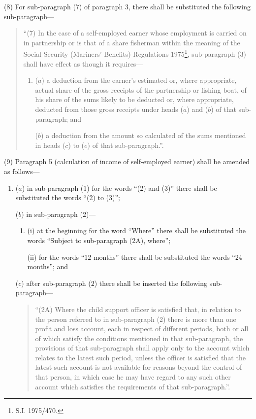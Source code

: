 \documentclass[12pt,a4paper]{article}
\begin{document}
(8) For sub-paragraph (7) of paragraph 3, there shall be substituted the following sub-paragraph—
\begin{quotation}
“(7) In the case of a self-employed earner whose employment is carried on in partnership or is that of a share fisherman within the meaning of the Social Security (Mariners' Benefits) Regulations 1975\footnote{\frenchspacing S.I. 1975/470.}, sub-paragraph (3) shall have effect as though it requires—
\begin{enumerate}\item[]
($a$) a deduction from the earner’s estimated or, where appropriate, actual share of the gross receipts of the partnership or fishing boat, of his share of the sums likely to be deducted or, where appropriate, deducted from those gross receipts under heads ($a$) and ($b$) of that sub-paragraph; and

($b$) a deduction from the amount so calculated of the sums mentioned in heads ($c$) to ($e$) of that sub-paragraph.”.
\end{enumerate}
\end{quotation}

(9) Paragraph 5 (calculation of income of self-employed earner) shall be amended as follows—
\begin{enumerate}\item[]
($a$) in sub-paragraph (1) for the words “(2) and (3)” there shall be substituted the words “(2) to (3)”;

($b$) in sub-paragraph (2)—
\begin{enumerate}\item[]
(i) at the beginning for the word “Where” there shall be substituted the words “Subject to sub-paragraph (2A), where”;

(ii) for the words “12 months” there shall be substituted the words “24 months”; and
\end{enumerate}

($c$) after sub-paragraph (2) there shall be inserted the following sub-paragraph—
\begin{quotation}
“(2A) Where the child support officer is satisfied that, in relation to the person referred to in sub-paragraph (2) there is more than one profit and loss account, each in respect of different periods, both or all of which satisfy the conditions mentioned in that sub-paragraph, the provisions of that sub-paragraph shall apply only to the account which relates to the latest such period, unless the officer is satisfied that the latest such account is not available for reasons beyond the control of that person, in which case he may have regard to any such other account which satisfies the requirements of that sub-paragraph.”.
\end{quotation}
\end{enumerate}
\end{document}
